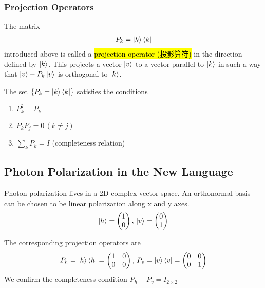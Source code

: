 \subsubsection{Projection Operators}
The matrix
\begin{align*}
    P_k=\ket{k}\bra{k}
\end{align*}
introduced above is called a \hl{projection operator (投影算符)} in the direction defined by $\ket{k}$. This projects a vector $\ket{v}$ to a vector parallel to $\ket{k}$ in such a way that $\ket{v}-P_k\ket{v}$ is orthogonal to $\ket{k}$. 

The set $\left\{ P_k=\ket{k}\bra{k} \right\}$ satisfies the conditions
\begin{enumerate}
    \item $\displaystyle P_k^2=P_k$
    \item $\displaystyle P_kP_j=0 \, (k \ne j)$
    \item $ \displaystyle \sum_k P_k =I$ (completeness relation)
\end{enumerate}

\subsection{Photon Polarization in the New Language}
Photon polarization lives in a 2D complex vector space. An orthonormal basis can be chosen to be linear polarization along x and y axes.
\begin{align*}
    \ket{h}=\begin{pmatrix}
        1\\0
    \end{pmatrix},\, \ket{v}=\begin{pmatrix}
        0\\1
    \end{pmatrix}
\end{align*}

The corresponding projection operators are
\begin{align*}
    P_h=\ket{h}\bra{h}=\begin{pmatrix}
        1 & 0\\ 0 & 0
    \end{pmatrix}, \, P_v=\ket{v}\bra{v}=\begin{pmatrix}
        0 & 0\\ 0 & 1
    \end{pmatrix}
\end{align*}
We confirm the completeness condition $P_h+P_v=I_{2\times 2}$

